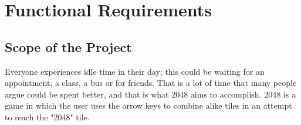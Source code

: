 \documentclass[12pt]{article}
\begin{document}
\section{Functional Requirements}
\subsection{Scope of the Project}
Everyone experiences idle time in their day; this could be waiting for an appointment, a class, a bus or for friends. That is a lot of time that many people argue could be spent better, and that is what 2048 aims to accomplish. 2048 is a game in which the user uses the arrow keys to combine alike tiles in an attempt to reach the "2048" tile.
\end{document}
